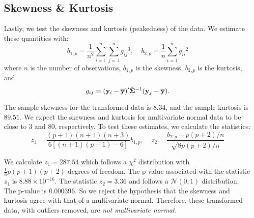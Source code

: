 \global\def\ds{\displaystyle}

  \subsection{Skewness \& Kurtosis}
    Lastly, we test the skewness and kurtosis (peakedness) of the data. We estimate these
    quantities with:
    \[ b_{1,p} = \frac{1}{n^2} 
                      \sum\limits_{i=1}^n\sum\limits_{j=1}^n {g_{ij}}^3,~~~~~
          b_{2,p} = \frac{1}{n} \sum\limits_{i=1}^n {g_{ii}}^2 \]
    \noindent where $n$ is the number of observations, $b_{1,p}$ is the skewness,
    $b_{2,p}$ is the kurtosis, and
    \[
      g_{ij} = (\mathbf{\bm{y}}_i-\overline{\mathbf{\bm{y}}})' \hat{\mathbf{\bm{\Sigma}}}^{-1}(\mathbf{\bm{y}}_j-\overline{\mathbf{\bm{y}}}).
    \]
    
    The sample skewness for the transformed data is $8.34$, and the sample kurtosis is
    $89.51$. We expect the skewness and kurtosis for
    multivariate normal data to be close to $3$ and $80$, respectively. To test these estimates, we calculate the statistics:
    \[  z_1 = \frac{\ds(p+1)(n+1)(n+3)}{\ds6[(n+1)(p+1)-6]}b_{1,p}, ~~~~~
        z_2 = \frac{\ds b_{2,p}-p(p+2)/n}
                     {\ds \sqrt{8p(p+2)/n}} \]

    We calculate $z_1 = 287.54$ which follows a $\chi^2$ distribution with $\frac{1}{6}p(p+1)(p+2)$ degrees of freedom. The p-value associated
    with the statistic $z_1$ is $8.88 \times 10^{-16}$. The statistic $z_2=3.36$ and follows
    a $\mathcal{N}(0,1)$ distribution. The p-value is 0.000396.  So we reject the hypothesis that the skewness and kurtosis agree with that of a multivariate normal. Therefore, these 
    transformed data, with outliers removed, are \emph{not multivariate
    normal}. 
